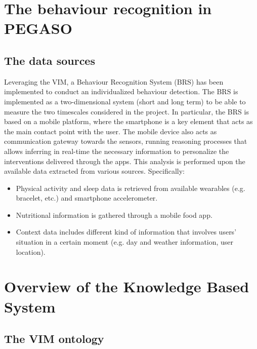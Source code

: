 \documentclass[runningheads,a4paper]{llncs}
\begin{document}
\section{The behaviour recognition in PEGASO}

\subsection{The data sources }

Leveraging the VIM, a Behaviour Recognition System (BRS) has been implemented to conduct an individualized behaviour detection. The BRS is implemented as a two-dimensional system (short and long term) to be able to measure the two timescales considered in the project. In particular, the BRS is based on a mobile platform, where the smartphone is a key element that acts as the main contact point with the user. The mobile device also acts as communication gateway towards the sensors, running reasoning processes that allows inferring in real-time the necessary information to personalize the interventions delivered through the apps. This analysis is performed upon the available data extracted from various sources. Specifically:
\begin{itemize}
\item Physical activity and sleep data is retrieved from available wearables (e.g. bracelet, etc.) and smartphone accelerometer.  
\item Nutritional information is gathered through a mobile food app. 
\item Context data includes different kind of information that involves users' situation in a certain moment (e.g. day and weather information, user location).
\end{itemize}

\section{Overview of the Knowledge Based System}

\subsection{The VIM ontology}
\end{document}
